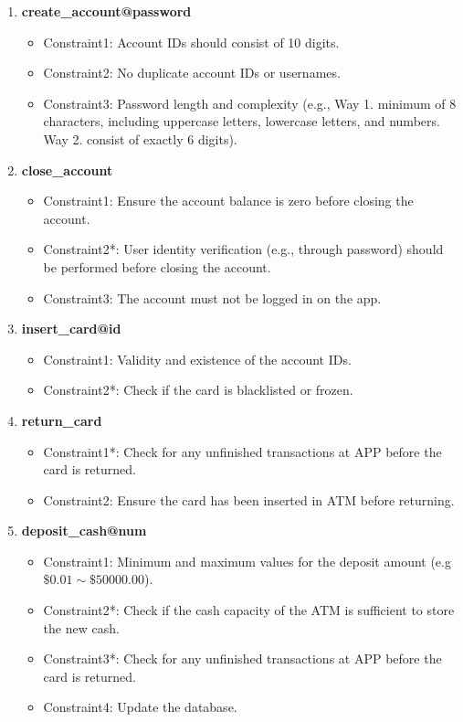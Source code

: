\documentclass[12pt]{article}
\begin{document}
\begin{enumerate}
    \item \textbf{create\_account@password}
        \begin{itemize}

            \item Constraint1: Account IDs should consist of 10 digits.
            \item Constraint2: No duplicate account IDs or usernames.
            \item Constraint3: Password length and complexity (e.g., Way 1. minimum of 8 characters, including uppercase letters, lowercase letters, and numbers. Way 2. consist of exactly 6 digits).
        \end{itemize}
        
    \item \textbf{close\_account}
        \begin{itemize}
            \item Constraint1: Ensure the account balance is zero before closing the account.
            \item Constraint2*: User identity verification (e.g., through password) should be performed before closing the account. 
            \item Constraint3: The account must not be logged in on the app.
        \end{itemize}
        
    \item \textbf{insert\_card@id}
        \begin{itemize}
            \item Constraint1: Validity and existence of the account IDs.
            \item Constraint2*: Check if the card is blacklisted or frozen.
        \end{itemize}
        
    \item \textbf{return\_card}
        \begin{itemize}
            \item Constraint1*: Check for any unfinished transactions at APP before the card is returned.
            \item Constraint2: Ensure the card has been inserted in ATM before returning.
        \end{itemize}
        
    \item \textbf{deposit\_cash@num}
        \begin{itemize}
            \item Constraint1: Minimum and maximum values for the deposit amount (e.g $ \$0.01\sim \$50000.00$).
            \item Constraint2*: Check if the cash capacity of the ATM is sufficient to store the new cash.
            \item Constraint3*: Check for any unfinished transactions at APP before the card is returned.
            \item Constraint4: Update the database.
        \end{itemize}
        

\end{enumerate}
\end{document}
